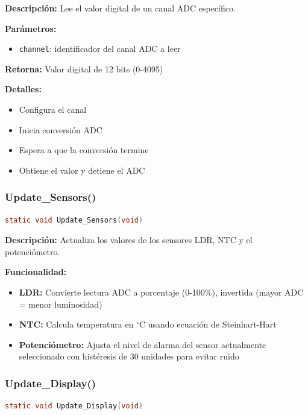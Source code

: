 \documentclass[12pt,a4paper]{article}
\begin{document}
\textbf{Descripción:} Lee el valor digital de un canal ADC específico.

\textbf{Parámetros:}
\begin{itemize}
    \item \texttt{channel}: identificador del canal ADC a leer
\end{itemize}

\textbf{Retorna:} Valor digital de 12 bits (0-4095)

\textbf{Detalles:}
\begin{itemize}
    \item Configura el canal
    \item Inicia conversión ADC
    \item Espera a que la conversión termine
    \item Obtiene el valor y detiene el ADC
\end{itemize}

\subsubsection{Update\_Sensors()}
\begin{lstlisting}[language=C, caption=Actualización de valores de sensores]
static void Update_Sensors(void)
\end{lstlisting}

\textbf{Descripción:} Actualiza los valores de los sensores LDR, NTC y el potenciómetro.

\textbf{Funcionalidad:}
\begin{itemize}
    \item \textbf{LDR:} Convierte lectura ADC a porcentaje (0-100\%), invertida (mayor ADC = menor luminosidad)
    \item \textbf{NTC:} Calcula temperatura en $^\circ$C usando ecuación de Steinhart-Hart
    \item \textbf{Potenciómetro:} Ajusta el nivel de alarma del sensor actualmente seleccionado con histéresis de 30 unidades para evitar ruido
\end{itemize}

\subsubsection{Update\_Display()}
\begin{lstlisting}[language=C, caption=Actualización de visualización en LEDs]
static void Update_Display(void)
\end{lstlisting}
\end{document}
